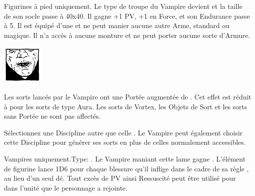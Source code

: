 \begin{multicols}{2}
 Figurines à pied uniquement. Le type de troupe du Vampire devient \monstrousinfantry{} et la taille de son socle passe à \unit{40x40}{\milli\meter}. Il gagne +1 PV, +1 en Force,  et son Endurance passe à 5. Il est équipé d'une \pw{} et ne peut manier aucune autre Arme, standard ou magique. Il n'a accès à aucune monture et ne peut porter aucune sorte d'Armure.

\endpricelist

\begin{center}\includegraphics[width=2cm]{logos/logo_nosferatu.png}\end{center}
\vspace*{-1.2cm}

\startpricelist

 Les sorts lancés par le Vampire ont une Portée augmentée de . Cet effet est réduit à  pour les sorts de type Aura. Les sorts de Vortex, les Objets de Sort et les sorts sans Portée ne sont pas affectés.

 Sélectionnez une Discipline \battle{} autre que celle \nature{}. Le Vampire peut également choisir cette Discipline pour générer ses sorts en plus de celles normalement accessibles.

\endpricelist

\end{multicols}

\closearmynewsection

\startarmymagicalitems

\armymagicalweapons

\startpricelist

 Vampires uniquement.\newline Type: \hw{}. Le Vampire maniant cette lame gagne . L'élément de figurine lance 1D6 pour chaque blessure qu'il inflige dans le cadre de sa règle \vampiric{}, au lieu d'un seul dé. Tout excès de PV ainsi Ressuscité peut être utilisé pour \raisewounds{} dans l'unité que le personnage a rejointe.

